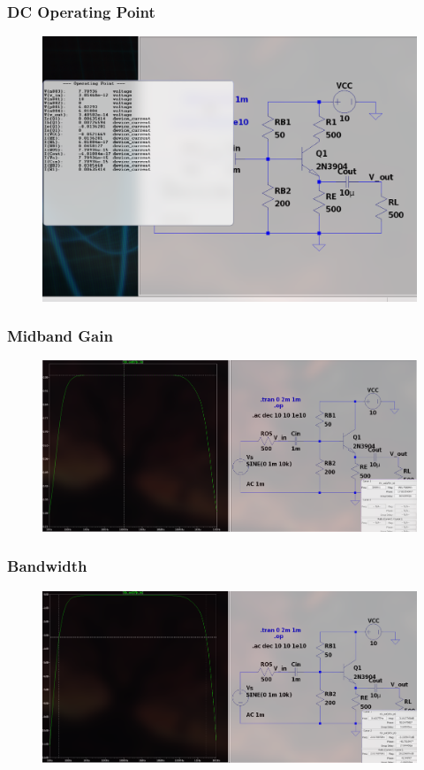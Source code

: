 \documentclass{article}
\begin{document}
\subsubsection{DC Operating Point}
\begin{figure}[h!]
        \centering
        \includegraphics[width=0.7\linewidth]{figs/bjt_cc_op.png}
    \end{figure}
\pagebreak
\subsubsection{Midband Gain}
\begin{figure}[h!]
        \centering
        \includegraphics[width=0.7\linewidth]{figs/bjt_cc_mb.png}
    \end{figure}
\subsubsection{Bandwidth}
\begin{figure}[h!]
        \centering
        \includegraphics[width=0.7\linewidth]{figs/bjt_cc_bw.png}
    \end{figure}
\end{document}
